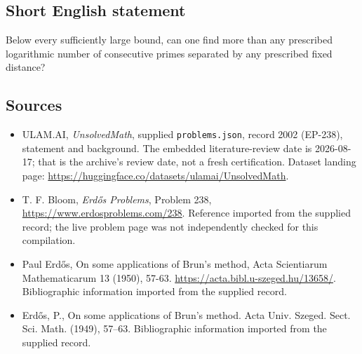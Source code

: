 \documentclass[11pt,a4paper]{article}
\begin{document}
\subsection{Short English statement}

Below every sufficiently large bound, can one find more than any prescribed logarithmic number of consecutive primes separated by any prescribed fixed distance?

\subsection{Sources}

{\small

\begin{itemize}

\item[\hypertarget{source:2002:1}{S1}] ULAM.AI, \emph{UnsolvedMath}, supplied \texttt{problems.json}, record 2002 (EP-238), statement and background. The embedded literature-review date is 2026-08-17; that is the archive’s review date, not a fresh certification. Dataset landing page: \url{https://huggingface.co/datasets/ulamai/UnsolvedMath}.

\item[\hypertarget{source:2002:2}{S2}] T. F. Bloom, \emph{Erdős Problems}, Problem 238, \url{https://www.erdosproblems.com/238}. Reference imported from the supplied record; the live problem page was not independently checked for this compilation.

\item[\hypertarget{source:2002:3}{S3}] Paul Erdős, On some applications of Brun's method, Acta Scientiarum Mathematicarum 13 (1950), 57-63. \url{https://acta.bibl.u-szeged.hu/13658/}. Bibliographic information imported from the supplied record.

\item[\hypertarget{source:2002:4}{S4}] Erd\H{o}s, P., On some applications of {B}run's method. Acta Univ. Szeged. Sect. Sci. Math. (1949), 57--63. Bibliographic information imported from the supplied record.

\end{itemize}

}

\label{end:2002}
\end{document}
